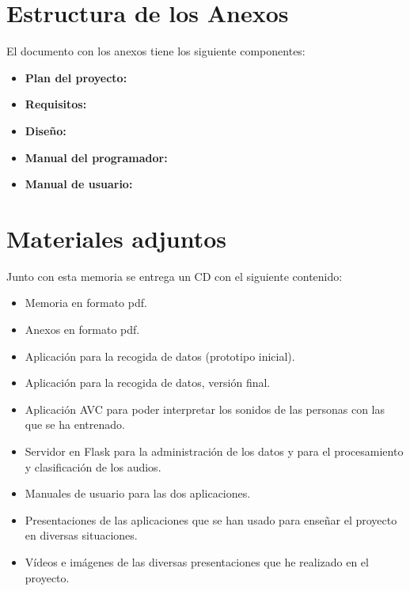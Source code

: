 \section{Estructura de los Anexos}
El documento con los anexos tiene los siguiente componentes:
\begin{itemize}
	\item
	\textbf{Plan del proyecto:}
	\item
	\textbf{Requisitos:}
	\item
	\textbf{Diseño:}
	\item
	\textbf{Manual del programador:}
	\item
	\textbf{Manual de usuario:}	
\end{itemize}

\section{Materiales adjuntos}
Junto con esta memoria se entrega un CD con el siguiente contenido:
\begin{itemize}
	\item Memoria en formato pdf.
	\item Anexos en formato pdf.
	\item Aplicación para la recogida de datos (prototipo inicial).
	\item Aplicación para la recogida de datos, versión final.
	\item Aplicación AVC para poder interpretar los sonidos de las personas con las que se ha entrenado.
	\item Servidor en Flask para la administración de los datos y para el procesamiento y clasificación de los audios.
	\item Manuales de usuario para las dos aplicaciones.
	\item Presentaciones de las aplicaciones que se han usado para enseñar el proyecto en diversas situaciones.
	\item Vídeos e imágenes de las diversas presentaciones que he realizado en el proyecto.
\end{itemize}	